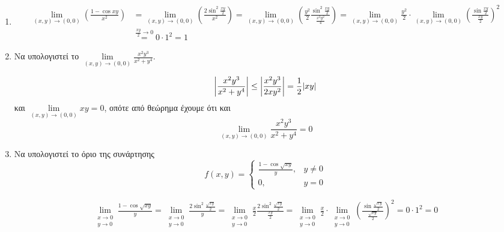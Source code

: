 \begin{enumerate}
    \item 
        \begin{align*} \lim\limits_{(x,y)\to (0, 0)} \left(\frac{1- \cos{xy}}{x^{2}}\right) &=
        \lim\limits_{(x,y)\to (0, 0)} \left( \frac{2 \sin^{2}{\frac{xy}{2}}}{x^{2}} \right) =
        \lim\limits_{(x,y)\to (0, 0)} \left( \frac{y^{2}}{2}\frac{\sin^{2}{\frac{xy}{2}}}{\frac{x^{2}y^{2}}{4}}
            \right) 
            = \lim\limits_{(x,y)\to (0, 0)} \frac{y^{2}}{2} \cdot \lim\limits_{(x,y)\to
            (0, 0)} \left(\frac{\sin{\frac{xy}{2}}}{\frac{xy}{2}}\right)^{2} \\ &\overset{\frac{xy}{2}
   \to 0 }{=}
          0 \cdot 1^{2} = 1 \end{align*}

       \item Να υπολογιστεί το $
               \lim\limits_{(x,y)\to (0, 0)} \frac{x^{2}y^{3}}{x^{2}+y^{4}} $.
               \begin{solution}
                   \[
                       \abs{\frac{x^{2}y^{3}}{x^{2}+y^{4}}} \leq \abs{\frac{x^{2}y^{3}}{2xy^{2}}} =
                       \frac{1}{2} \abs{xy}
                    \] 
                    και $ \lim\limits_{(x,y)\to (0, 0)} xy = 0 $, οπότε από θεώρημα έχουμε ότι και 
                    \[
                        \lim\limits_{(x,y)\to (0, 0)} \frac{x^{2}y^{3}}{x^{2}+y^{4}} = 0 
                     \] 
                   
               \end{solution}
      \item Να υπολογιστεί το όριο της συνάρτησης
          \[
              f(x,y) = \begin{cases} \frac{1 - \cos{\sqrt{xy}}}{y}, & y \neq 0 \\ 0, & y =0 \end{cases}  
           \] 
           \begin{solution}
              \begin{align*}
                  \lim\limits_{\substack{x\to 0 \\y \to 0}} \frac{1- \cos{\sqrt{xy}}}{y} =
                  \lim\limits_{\substack{x\to 0 \\y \to 0}} \frac{2
                  \sin^{2}{\frac{\sqrt{xy}}{2}}}{y} = 
                  \lim\limits_{\substack{x\to 0 \\y \to 0}} \frac{x}{2} \frac{2
                  \sin^{2}{\frac{\sqrt{xy}}{2}}}{\frac{xy}{2}} =
                  \lim\limits_{\substack{x\to 0 \\y \to 0}} \frac{x}{2} \cdot\lim\limits_{\substack{x\to 0 \\y \to 0}}
                  \left(\frac{\sin{\frac{\sqrt{xy}}{2}}}{\frac{\sqrt{xy}}{2}} \right)^{2} 
                  = 0 \cdot 1^{2} = 0 
               \end{align*} 
           \end{solution}

\end{enumerate}



